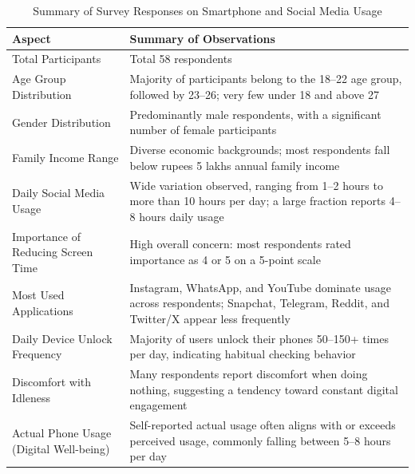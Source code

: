 \documentclass[12pt]{article}
\begin{document}
\begin{enumerate}
    \begin{table}[h]
    \centering
    \caption{Summary of Survey Responses on Smartphone and Social Media Usage}
    \label{tab:survey_summary}
    \begin{tabular}{|p{5cm}|p{8cm}|}
    \hline
    \textbf{Aspect} & \textbf{Summary of Observations} \\
    \hline
    Total Participants & Total 58 respondents \\
    \hline
    Age Group Distribution & Majority of participants belong to the 18--22 age group, followed by 23--26; very few under 18 and above 27 \\
    \hline
    Gender Distribution & Predominantly male respondents, with a significant number of female participants \\
    \hline
    Family Income Range & Diverse economic backgrounds; most respondents fall below rupees 5 lakhs annual family income \\
    \hline
    Daily Social Media Usage & Wide variation observed, ranging from 1--2 hours to more than 10 hours per day; a large fraction reports 4--8 hours daily usage \\
    \hline
    Importance of Reducing Screen Time & High overall concern: most respondents rated importance as 4 or 5 on a 5-point scale \\
    \hline
    Most Used Applications & Instagram, WhatsApp, and YouTube dominate usage across respondents; Snapchat, Telegram, Reddit, and Twitter/X appear less frequently \\
    \hline
    Daily Device Unlock Frequency & Majority of users unlock their phones 50--150+ times per day, indicating habitual checking behavior \\
    \hline
    Discomfort with Idleness & Many respondents report discomfort when doing nothing, suggesting a tendency toward constant digital engagement \\
    \hline
    Actual Phone Usage (Digital Well-being) & Self-reported actual usage often aligns with or exceeds perceived usage, commonly falling between 5--8 hours per day \\
    \hline
    \end{tabular}
    \end{table}

\end{enumerate}
\end{document}
